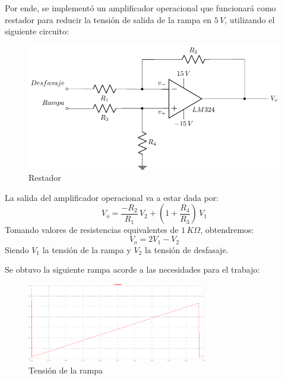 Por ende, se implementó un amplificador operacional que funcionará como restador para reducir la tensión de salida de la rampa en $5\,V$, utilizando el siguiente circuito:

\begin{figure}[H]
\centering
\includegraphics[scale=0.8]{Ejercicio8/Circuitos/Restador.pdf}
\caption{Restador}
\label{fig:Restador}
\end{figure}
\par
La salida del amplificador operacional va a estar dada por:
\begin{equation}
V_o=\frac{-R_2}{R_1}\,V_2+\left(1+\frac{R_4}{R_3}\right)\,V_1
\end{equation}
Tomando valores de resistencias equivalentes de $1\,K\Omega$, obtendremos:
\begin{equation}
V_o=2V_1-V_2
\end{equation}
Siendo $V_1$ la tensión de la rampa y $V_2$ la tensión de desfasaje.\par\par\par
Se obtuvo la siguiente rampa acorde a las necesidades para el trabajo:

\begin{figure}[H]
\centering
\includegraphics[width=0.7\textwidth]{Ejercicio8/Imagenes/Rampa}
\caption{Tensión de la rampa}
\label{fig:Generador_de_rampa_LTSpice}
\end{figure}



